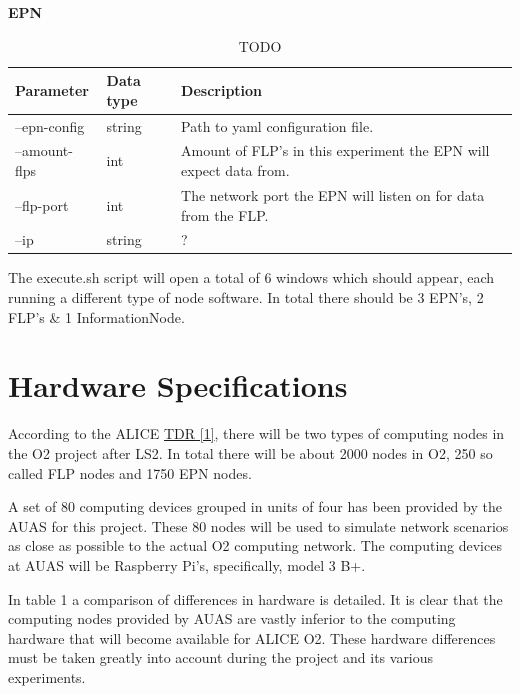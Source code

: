 \documentclass[]{article}
\begin{document}
\begin{table}[H]
	\textbf{EPN}	
	\begin{center}	
		\begin{tabularx}{\textwidth}{ | l | l | X | }
			\hline
			\textbf{Parameter} & \textbf{Data type} & \textbf{Description} \\ \hline	
					
			--epn-config & string & Path to yaml configuration file. \\ \hline
			--amount-flps & int & Amount of FLP’s in this experiment the EPN will expect data from. \\ \hline
			--flp-port & int & The network port the EPN will listen on for data from the FLP. \\ \hline
			--ip & string & ? \\ \hline
		\end{tabularx}
		\caption{TODO}
		\label{tab:specs}
	\end{center}
\end{table}

The execute.sh script will open a total of 6 windows which should appear, each running a different type of node software. In total there should be 3 EPN’s, 2 FLP’s \& 1 InformationNode.


\section{Hardware Specifications}
According to the \acrfull{ALICE} \hyperref[sec:ref01]{\acrfull{TDR} [1]}, there will be two types of computing nodes in the O2 project after \acrfull{LS2}. In total there will be about 2000 nodes in O2, 250 so called FLP nodes and 1750 EPN nodes.

A set of 80 computing devices grouped in units of four has been provided by the \acrfull{AUAS} for this project. These 80 nodes will be used to simulate network scenarios as close as possible to the actual O2 computing network. The computing devices at \acrshort{AUAS} will be Raspberry Pi’s, specifically, model 3 B+.

In table 1 a comparison of differences in hardware is detailed. It is clear that the computing nodes provided by \acrshort{AUAS} are vastly inferior to the computing hardware that will become available for \acrshort{ALICE} O2. These hardware differences must be taken greatly into account during the project and its various experiments.
\end{document}
